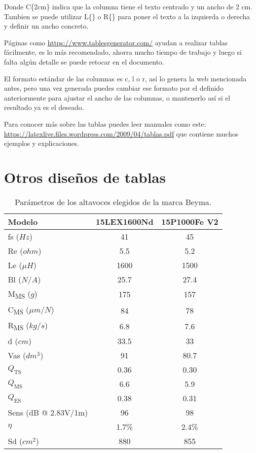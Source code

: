Donde C\{2cm\} indica que la columna tiene el texto centrado y un ancho de 2 cm. Tambien se puede utilizar L\{\} o R\{\} para poner el texto a la izquierda o derecha y definir un ancho concreto.

Páginas como \url{https://www.tablesgenerator.com/} ayudan a realizar tablas fácilmente, es lo más recomendado, ahorra mucho tiempo de trabajo y luego si falta algún detalle se puede retocar en el documento.

El formato estándar de las columnas es c, l o r, así lo genera la web mencionada antes, pero una vez generada puedes cambiar ese formato por el definido anteriormente para ajustar el ancho de las columnas, o mantenerlo así si el resultado ya es el deseado.

\par Para conocer más sobre las tablas puedes leer manuales como este: \url{https://latexlive.files.wordpress.com/2009/04/tablas.pdf} que contiene muchos ejemplos y explicaciones.


\section{Otros diseños de tablas}

\begin{table}[ht]
	\centering
	{
	\begin{tabular}{@{}lcc@{}}
	\toprule
	Modelo			& 	15LEX1600Nd	&	15P1000Fe V2	 	\\ \midrule
	fs ($Hz$)		& 	41          & 	45           	\\
	Re ($ohm$)		& 5.5         	& 5.2         	 	\\
	Le ($\mu H$)	& 1600        	& 1500         		\\
	Bl ($N/A$)		& 25.7        	& 27.4         		\\
	M\textsubscript{MS} ($g$)		& 175	& 157		\\
	C\textsubscript{MS} ($\mu m/N$)	& 84		& 78			\\
	R\textsubscript{MS} ($kg/s$)		& 6.8 	& 7.6   	 	\\
	d ($cm$)		& 33.5			& 33           		\\
	Vas ($dm^3$)   	& 91          	& 80.7         		\\
	$Q_\text{TS}$  	& 0.36        	& 0.30         		\\
	$Q_\text{MS}$  	& 6.6         	& 5.9          		\\
	$Q_\text{ES}$  	& 0.38        	& 0.31         		\\
	Sens (dB @ 2.83V/1m) & 96      	& 98           		\\
	$\eta$          & 1.7\%       	& 2.4\%        		\\
	Sd ($cm^2$)   	& 880         	& 855          		\\ \bottomrule
	\end{tabular}
	}
	\caption{Parámetros de los altavoces elegidos de la marca Beyma\textsuperscript{\tiny\textregistered}.}
	\label{tablaparametros}
\end{table}

